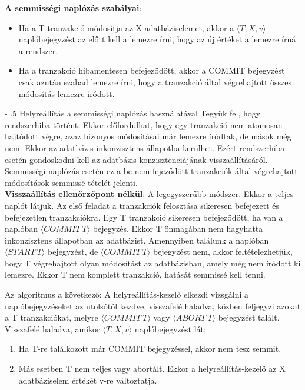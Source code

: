 \documentclass[margin=0px]{article}
\makeatletter
\renewcommand\paragraph{%
	\@startsection{paragraph}{4}{0mm}%
	{-\baselineskip}%
	{.5\baselineskip}%
	{\normalfont\normalsize\bfseries}}
\makeatother
\begin{document}
\noindent \textbf{A semmisségi naplózás szabályai}:
\begin{itemize}
    \item	Ha a T tranzakció módosítja az X adatbáziselemet, akkor a $\langle T,X,v\rangle$ naplóbejegyzést az előtt kell
          a lemezre írni, hogy az új értéket a lemezre írná a rendszer.

    \item	Ha a tranzakció hibamentesen befejeződött, akkor a COMMIT bejegyzést csak azután szabad lemezre írni, hogy
          a tranzakció által végrehajtott összes módosítás lemezre íródott.
\end{itemize}

\paragraph{Helyreállítás a semmisségi naplózás használatával}
Tegyük fel, hogy rendszerhiba történt. Ekkor előfordulhat, hogy egy tranzakció nem atomosan hajtódott végre, azaz
bizonyos módosításai már lemezre íródtak, de mások még nem. Ekkor az adatbázis inkonzisztens állapotba kerülhet.
Ezért rendszerhiba esetén gondoskodni kell az adatbázis konzisztenciájának visszaállításáról. Semmisségi naplózás
esetén ez a be nem fejeződött tranzakciók által végrehajtott módosítások semmissé tételét jelenti.\\

\noindent \textbf{Visszaállítás ellenőrzőpont nélkül}: A legegyszerűbb módszer. Ekkor a teljes naplót látjuk. Az első feladat
a tranzakciók felosztása sikeresen befejezett és befejezetlen tranzakciókra. Egy T tranzakció sikeresen befejeződött, ha
van a naplóban $\langle COMMIT \ T \rangle$ bejegyzés. Ekkor T önmagában nem hagyhatta inkonzisztens állapotban az adatbázist.
Amennyiben találunk a naplóban $\langle START \ T \rangle$ bejegyzést, de $\langle COMMIT \ T \rangle$ bejegyzést nem, akkor
feltételezhetjük, hogy T végrehajtott olyan módosítást az adatbázisban, amely még nem íródott ki lemezre. Ekkor T nem komplett
tranzakció, hatását semmissé kell tenni.

\noindent Az algoritmus a következő:
A helyreállítás-kezelő elkezdi vizsgálni a naplóbejegyzéseket az utolsótól kezdve, visszafelé haladva, közben feljegyzi azokat a
T tranzakciókat, melyre $\langle COMMIT \ T \rangle$ vagy $\langle ABORT \ T \rangle$ bejegyzést talált. Visszafelé
haladva, amikor $\langle T,X,v\rangle$ naplóbejegyzést lát:

\begin{enumerate}
    \item	Ha T-re találkozott már COMMIT bejegyzéssel, akkor nem tesz semmit.
    \item	Más esetben T nem teljes vagy abortált. Ekkor a helyreállítás-kezelő az X adatbáziselem értékét v-re változtatja.
\end{enumerate}
\end{document}
